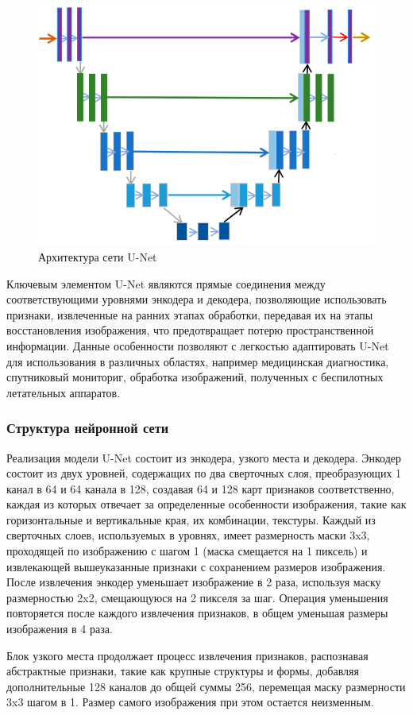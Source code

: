 \begin{figure}[h]
	\centering
	\includegraphics[width=0.7\linewidth]{images/unet}
	\caption{Архитектура сети U-Net}
	\label{fig:unet}
\end{figure}

Ключевым элементом U-Net являются прямые соединения между соответствующими уровнями энкодера и декодера, позволяющие использовать признаки, извлеченные на ранних этапах обработки, передавая их на этапы восстановления изображения, что предотвращает потерю пространственной информации. Данные особенности позволяют с легкостью адаптировать U-Net для использования в различных областях, например медицинская диагностика, спутниковый мониториг, обработка изображений, полученных с беспилотных летательных аппаратов.

\subsubsection{Структура нейронной сети}

Реализация модели U-Net состоит из энкодера, узкого места и декодера. Энкодер состоит из двух уровней, содержащих по два сверточных слоя, преобразующих 1 канал в 64 и 64 канала в 128, создавая 64 и 128 карт признаков соответственно, каждая из которых отвечает за определенные особенности изображения, такие как горизонтальные и вертикальные края, их комбинации, текстуры. Каждый из сверточных слоев, используемых в уровнях, имеет размерность маски 3x3, проходящей по изображению с шагом 1 (маска смещается на 1 пиксель) и извлекающей вышеуказанные признаки с сохранением размеров изображения. После извлечения энкодер уменьшает изображение в 2 раза, используя маску размерностью 2x2, смещающуюся на 2 пикселя за шаг. Операция уменьшения повторяется после каждого извлечения признаков, в общем уменьшая размеры изображения в 4 раза.

Блок узкого места продолжает процесс извлечения признаков, распознавая абстрактные признаки, такие как крупные структуры и формы, добавляя дополнительные 128 каналов до общей суммы 256, перемещая маску размерности 3x3 шагом в 1. Размер самого изображения при этом остается неизменным.

